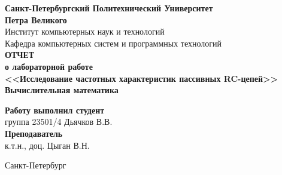 \begin{titlepage}
\begin{center}
	\textbf{Санкт-Петербургский Политехнический Университет \\Петра Великого}\\[0.3cm]
	\small Институт компьютерных наук и технологий \\[0.3cm]
	\small Кафедра компьютерных систем и программных технологий\\[4cm]
	
	\textbf{ОТЧЕТ}\\ \textbf{о лабораторной работе}\\[0.5cm]
	\textbf{<<Исследование частотных характеристик пассивных RC-цепей>>}\\[0.1cm]
	\textbf{Вычислительная математика}\\[8.0cm]
\end{center}

\begin{flushright}
	\begin{minipage}{0.5\textwidth}
		\begin{flushleft}
			\small \textbf{Работу выполнил студент}\\[3mm]
			\small группа 23501/4 \hspace*{6mm} Дьячков В.В.\\[5mm]
			
			\small \textbf{Преподаватель}\\[5mm]
		 	\small \sign[3cm] \hspace*{5mm} к.т.н., доц. Цыган В.Н.\\[0.5cm]
		\end{flushleft}
	\end{minipage}
\end{flushright}

\vfill

\begin{center}
	\small Санкт-Петербург\\
	\small \the\year
\end{center}
\end{titlepage}